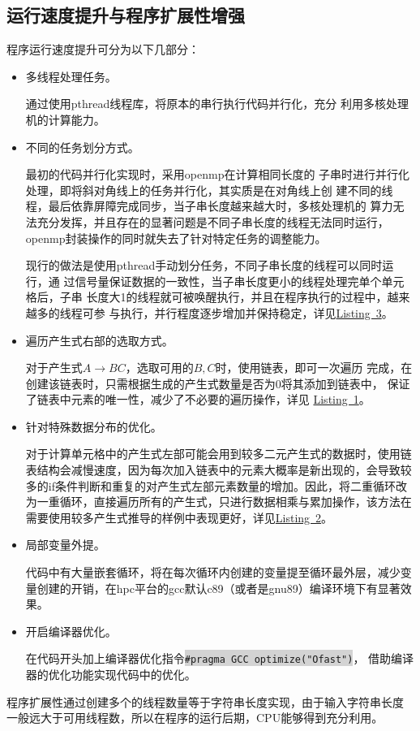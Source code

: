 \documentclass{ctexart}
\newcommand{\mdcode}[1]{\texttt{\colorbox{lightgray}{#1}}}
\begin{document}
\subsection{运行速度提升与程序扩展性增强}
程序运行速度提升可分为以下几部分：
\begin{itemize}
  \item
    多线程处理任务。

    通过使用pthread线程库，将原本的串行执行代码并行化，充分
    利用多核处理机的计算能力。
  \item
    不同的任务划分方式。

    最初的代码并行化实现时，采用openmp在计算相同长度的
    子串时进行并行化处理，即将斜对角线上的任务并行化，其实质是在对角线上创
    建不同的线程，最后依靠屏障完成同步，当子串长度越来越大时，多核处理机的
    算力无法充分发挥，并且存在的显著问题是不同子串长度的线程无法同时运行，
    openmp封装操作的同时就失去了针对特定任务的调整能力。

    现行的做法是使用pthread手动划分任务，不同子串长度的线程可以同时运行，通
    过信号量保证数据的一致性，当子串长度更小的线程处理完单个单元格后，子串
    长度大1的线程就可被唤醒执行，并且在程序执行的过程中，越来越多的线程可参
    与执行，并行程度逐步增加并保持稳定，详见\hyperref[lst:routine]{Listing\ 3}。
  \item
    遍历产生式右部的选取方式。

    对于产生式$A\rightarrow BC$，选取可用的$B,C$时，使用链表，即可一次遍历
    完成，在创建该链表时，只需根据生成的产生式数量是否为0将其添加到链表中，
    保证了链表中元素的唯一性，减少了不必要的遍历操作，详见
    \hyperref[lst:code0]{Listing\ 1}。
   \item
      针对特殊数据分布的优化。

      对于计算单元格中的产生式左部可能会用到较多二元产生式的数据时，使用链
      表结构会减慢速度，因为每次加入链表中的元素大概率是新出现的，会导致较
      多的if条件判断和重复的对产生式左部元素数量的增加。因此，将二重循环改
      为一重循环，直接遍历所有的产生式，只进行数据相乘与累加操作，该方法在
      需要使用较多产生式推导的样例中表现更好，详见\hyperref[lst:code1]{Listing\ 2}。
    \item
      局部变量外提。

      代码中有大量嵌套循环，将在每次循环内创建的变量提至循环最外层，减少变
      量创建的开销，在hpc平台的gcc默认c89（或者是gnu89）编译环境下有显著效
      果。

    \item
      开启编译器优化。

      在代码开头加上编译器优化指令\mdcode{\#pragma\ GCC\ optimize("Ofast")}，
      借助编译器的优化功能实现代码中的优化。

\end{itemize}
程序扩展性通过创建多个的线程数量等于字符串长度实现，由于输入字符串长度
一般远大于可用线程数，所以在程序的运行后期，CPU能够得到充分利用。
\end{document}
